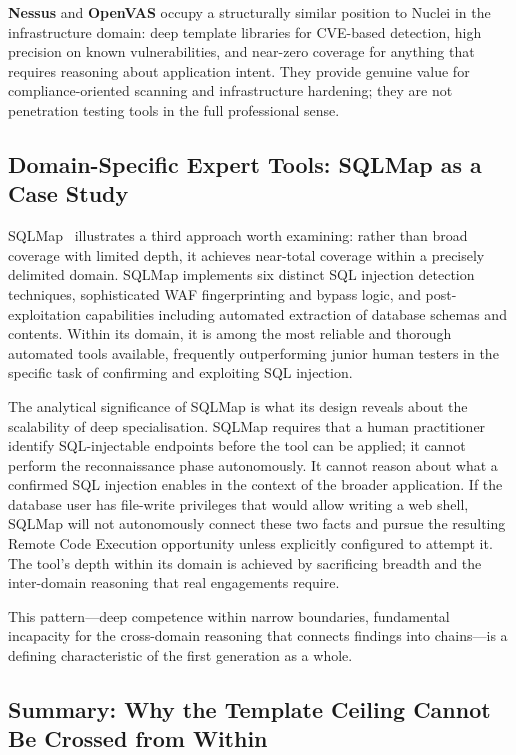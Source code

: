 \documentclass[12pt,a4paper,oneside,openany]{book}
\newcommand{\toolname}[1]{\textsf{#1}}
\begin{document}
\textbf{Nessus} and \textbf{OpenVAS} occupy a structurally similar position to Nuclei in the infrastructure domain: deep template libraries for CVE-based detection, high precision on known vulnerabilities, and near-zero coverage for anything that requires reasoning about application intent. They provide genuine value for compliance-oriented scanning and infrastructure hardening; they are not penetration testing tools in the full professional sense.

\subsection{Domain-Specific Expert Tools: SQLMap as a Case Study}

\toolname{SQLMap}~\citep{sqlmap} illustrates a third approach worth examining: rather than broad coverage with limited depth, it achieves near-total coverage within a precisely delimited domain. SQLMap implements six distinct SQL injection detection techniques, sophisticated WAF fingerprinting and bypass logic, and post-exploitation capabilities including automated extraction of database schemas and contents. Within its domain, it is among the most reliable and thorough automated tools available, frequently outperforming junior human testers in the specific task of confirming and exploiting SQL injection.

The analytical significance of SQLMap is what its design reveals about the scalability of deep specialisation. SQLMap requires that a human practitioner identify SQL-injectable endpoints before the tool can be applied; it cannot perform the reconnaissance phase autonomously. It cannot reason about what a confirmed SQL injection enables in the context of the broader application. If the database user has file-write privileges that would allow writing a web shell, SQLMap will not autonomously connect these two facts and pursue the resulting Remote Code Execution opportunity unless explicitly configured to attempt it. The tool's depth within its domain is achieved by sacrificing breadth and the inter-domain reasoning that real engagements require.

This pattern---deep competence within narrow boundaries, fundamental incapacity for the cross-domain reasoning that connects findings into chains---is a defining characteristic of the first generation as a whole.

\subsection{Summary: Why the Template Ceiling Cannot Be Crossed from Within}
\end{document}
